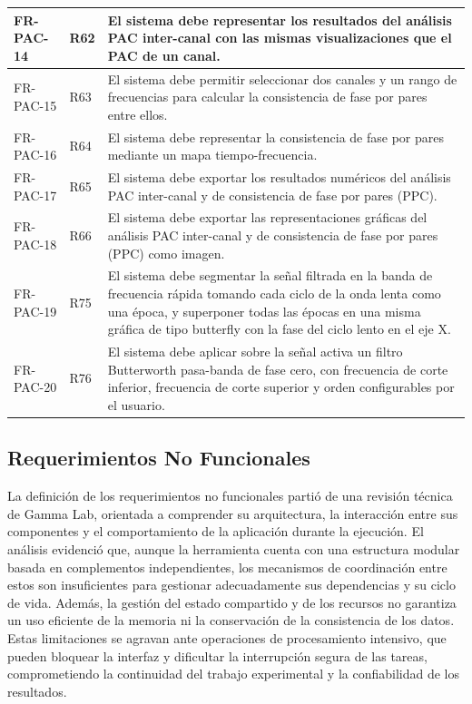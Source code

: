 \documentclass[12pt, letterpaper]{article}
\begin{document}
\begin{longtable}{|p{2.5cm}|p{2.5cm}|p{10.1cm}|}
\hline
FR-PAC-14 & R62 & El sistema debe representar los resultados del análisis PAC inter-canal con las mismas visualizaciones que el PAC de un canal. \\
\hline
FR-PAC-15 & R63 & El sistema debe permitir seleccionar dos canales y un rango de frecuencias para calcular la consistencia de fase por pares entre ellos. \\
\hline
FR-PAC-16 & R64 & El sistema debe representar la consistencia de fase por pares mediante un mapa tiempo-frecuencia. \\
\hline
FR-PAC-17 & R65 & El sistema debe exportar los resultados numéricos del análisis PAC inter-canal y de consistencia de fase por pares (PPC). \\
\hline
FR-PAC-18 & R66 & El sistema debe exportar las representaciones gráficas del análisis PAC inter-canal y de consistencia de fase por pares (PPC) como imagen. \\
\hline
FR-PAC-19 & R75 & El sistema debe segmentar la señal filtrada en la banda de frecuencia rápida tomando cada ciclo de la onda lenta como una época, y superponer todas las épocas en una misma gráfica de tipo butterfly con la fase del ciclo lento en el eje X. \\
\hline
FR-PAC-20 & R76 & El sistema debe aplicar sobre la señal activa un filtro Butterworth pasa-banda de fase cero, con frecuencia de corte inferior, frecuencia de corte superior y orden configurables por el usuario. \\

\end{longtable}
\vspace{-0.5em}
\label{tab:fr-pac}

\subsection{Requerimientos No Funcionales}

La definición de los requerimientos no funcionales partió de una revisión técnica de Gamma Lab, orientada a comprender su arquitectura, la interacción entre sus componentes y el comportamiento de la aplicación durante la ejecución. El análisis evidenció que, aunque la herramienta cuenta con una estructura modular basada en complementos independientes, los mecanismos de coordinación entre estos son insuficientes para gestionar adecuadamente sus dependencias y su ciclo de vida. Además, la gestión del estado compartido y de los recursos no garantiza un uso eficiente de la memoria ni la conservación de la consistencia de los datos. Estas limitaciones se agravan ante operaciones de procesamiento intensivo, que pueden bloquear la interfaz y dificultar la interrupción segura de las tareas, comprometiendo la continuidad del trabajo experimental y la confiabilidad de los resultados.
\end{document}
